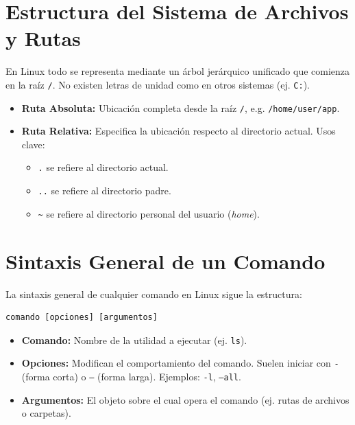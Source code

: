 \documentclass[12pt,a4paper]{article}
\begin{document}
\section{Estructura del Sistema de Archivos y Rutas}
En Linux todo se representa mediante un árbol jerárquico unificado que comienza en la raíz \texttt{/}. No existen letras de unidad como en otros sistemas (ej. \texttt{C:}).

\begin{center}
\end{center}

\begin{itemize}
    \item \textbf{Ruta Absoluta:} Ubicación completa desde la raíz \texttt{/}, e.g. \texttt{/home/user/app}.
    \item \textbf{Ruta Relativa:} Especifica la ubicación respecto al directorio actual. Usos clave:
    \begin{itemize}
        \item \texttt{.} se refiere al directorio actual.
        \item \texttt{..} se refiere al directorio padre.
        \item \texttt{\~{}} se refiere al directorio personal del usuario (\textit{home}).
    \end{itemize}
\end{itemize}

\section{Sintaxis General de un Comando}
La sintaxis general de cualquier comando en Linux sigue la estructura:
\begin{lstlisting}[numbers=none]
comando [opciones] [argumentos]
\end{lstlisting}

\begin{itemize}
    \item \textbf{Comando:} Nombre de la utilidad a ejecutar (ej. \texttt{ls}).
    \item \textbf{Opciones:} Modifican el comportamiento del comando. Suelen iniciar con \texttt{-} (forma corta) o \texttt{--} (forma larga). Ejemplos: \texttt{-l}, \texttt{--all}.
    \item \textbf{Argumentos:} El objeto sobre el cual opera el comando (ej. rutas de archivos o carpetas).
\end{itemize}
\end{document}
